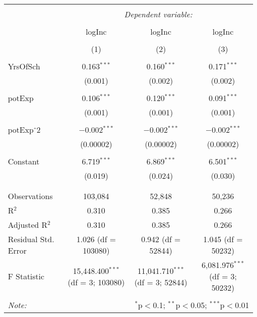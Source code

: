 \documentclass{article}\usepackage[]{graphicx}\usepackage[]{color}
\begin{document}
\begin{table}[!htbp] \centering
  \caption{}
  \label{}
\begin{tabular}{@{\extracolsep{5pt}}lccc}
\\[-1.8ex]\hline
\hline \\[-1.8ex]
 & \multicolumn{3}{c}{\textit{Dependent variable:}} \\
\cline{2-4}
\\[-1.8ex] & logInc & logInc & logInc \\
\\[-1.8ex] & (1) & (2) & (3)\\
\hline \\[-1.8ex]
 YrsOfSch & 0.163$^{***}$ & 0.160$^{***}$ & 0.171$^{***}$ \\
  &(0.001)& (0.002)& (0.002)\\
  & & & \\
 potExp & 0.106$^{***}$ & 0.120$^{***}$ & 0.091$^{***}$ \\
  &(0.001)& (0.001)& (0.001)\\
  & & & \\
 potExp$\hat{\mkern6mu}$2 & $-$0.002$^{***}$ & $-$0.002$^{***}$ & $-$0.002$^{***}$ \\
  & (0.00002) & (0.00002) & (0.00002) \\
  & & & \\
 Constant & 6.719$^{***}$ & 6.869$^{***}$ & 6.501$^{***}$ \\
  & (0.019) & (0.024) & (0.030) \\
  & & & \\
\hline \\[-1.8ex]
Observations & 103,084 & 52,848 & 50,236 \\
R$^{2}$ & 0.310 & 0.385 & 0.266 \\
Adjusted R$^{2}$ & 0.310 & 0.385 & 0.266 \\
Residual Std. Error & 1.026 (df = 103080) & 0.942 (df = 52844) & 1.045 (df = 50232) \\
F Statistic & 15,448.400$^{***}$ (df = 3; 103080) & 11,041.710$^{***}$ (df = 3; 52844) & 6,081.976$^{***}$ (df = 3; 50232) \\
\hline
\hline \\[-1.8ex]
\textit{Note:} & \multicolumn{3}{r}{$^{*}$p$<$0.1; $^{**}$p$<$0.05; $^{***}$p$<$0.01} \\
\end{tabular}
\end{table}

 
 
 
  
 
  
 





 

  

 
 
 
\end{document}
